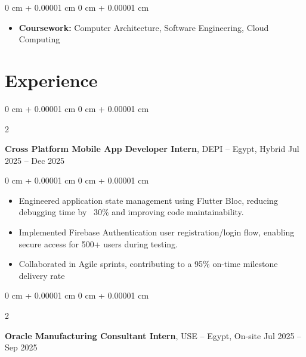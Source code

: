 \documentclass[10pt, letterpaper]{article}
\newenvironment{highlights}{
    \begin{itemize}[
        topsep=0.10 cm,
        parsep=0.10 cm,
        partopsep=0pt,
        itemsep=0pt,
        leftmargin=0 cm + 10pt
    ]
}{
    \end{itemize}
} %
\newenvironment{onecolentry}{
    \begin{adjustwidth}{
        0 cm + 0.00001 cm
    }{
        0 cm + 0.00001 cm
    }
}{
    \end{adjustwidth}
} %
\newenvironment{twocolentry}[2][]{
    \onecolentry
    \def\secondColumn{#2}
    \setcolumnwidth{\fill, 4.5 cm}
    \begin{paracol}{2}
}{
    \switchcolumn \raggedleft \secondColumn
    \end{paracol}
    \endonecolentry
} %
\begin{document}
        \vspace{0.10 cm}
        \begin{onecolentry}
            \begin{highlights}
                \item \textbf{Coursework:} Computer Architecture, Software Engineering, Cloud Computing
            \end{highlights}
        \end{onecolentry}
    
    \section{Experience}
        
        \begin{twocolentry}{
            Jul 2025 – Dec 2025
        }
            \textbf{Cross Platform Mobile App Developer Intern}, DEPI -- Egypt, Hybrid\end{twocolentry}

        \vspace{0.10 cm}
        \begin{onecolentry}
            \begin{highlights}
                \item Engineered application state management using Flutter Bloc, reducing debugging time by ~30\% and improving code maintainability.
                \item Implemented Firebase Authentication user registration/login flow, enabling secure access for 500+ users during testing.
                \item Collaborated in Agile sprints, contributing to a 95\% on-time milestone delivery rate
            \end{highlights}
        \end{onecolentry}


        \vspace{0.2 cm}

        \begin{twocolentry}{
            Jul 2025 – Sep 2025
        }
            \textbf{Oracle Manufacturing Consultant Intern}, USE -- Egypt, On-site\end{twocolentry}
\end{document}
